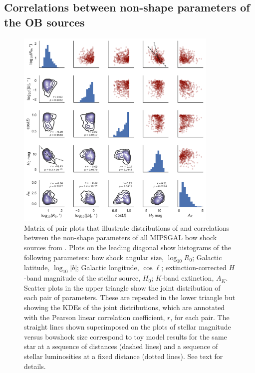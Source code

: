 \subsection{Correlations between non-shape parameters of the OB sources}
\label{sec:corr-size}

\begin{figure}
  \centering
  \includegraphics[width=0.86\textwidth]{figs/mipsgal-pairplot}
  \caption[]{Matrix of pair plots that illustrate distributions of and
    correlations between the non-shape parameters of all MIPSGAL bow
    shock sources from \citet{Kobulnicky:2016a}.  Plots on the leading
    diagonal show histograms of the following parameters: bow shock
    angular size, \(\log_{10} R_0\); Galactic latitude,
    \(\log_{10}|b|\); Galactic longitude, \(\cos \ell\);
    extinction-corrected \(H\)-band magnitude of the stellar source,
    \(H_0\); \(K\)-band extinction, \(A_K\).  Scatter plots in the
    upper triangle show the joint distribution of each pair of
    parameters.  These are repeated in the lower triangle but showing
    the KDEs of the joint distributions, which are annotated with the
    Pearson linear correlation coefficient, \(r\), for each pair. The
    straight lines shown superimposed on the plots of stellar magnitude
    versus bowshock size correspond to toy model results for the same star
    at a sequence of distances (dashed lines) and a sequence of
    stellar luminosities at a fixed distance (dotted lines).  See text
    for details. }
  \label{fig:mipsgal-pairplot}
\end{figure}

